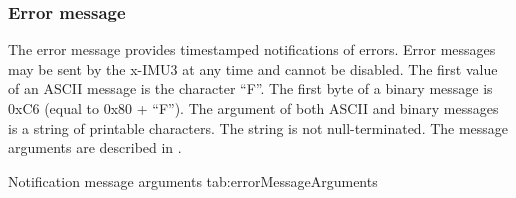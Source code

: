 \subsubsection{Error message}

The error message provides timestamped notifications of errors.  Error messages may be sent by the x-IMU3 at any time and cannot be disabled.  The first value of an \ac{ASCII} message is the character \enquote{F}.  The first byte of a binary message is 0xC6 (equal to 0x80 + \enquote{F}).  The argument of both \ac{ASCII} and binary messages is a string of printable characters.  The string is not null-terminated.  The message arguments are described in .

\begingroup
    \def\tempArgumentA{Error string}
    \dataMessageTable
    {Notification message arguments}
    {tab:errorMessageArguments}
\endgroup

\begingroup
    \def\tempNameA{String}
    \def\tempValueA{Battery empty.}
    \def\tempAsciiFirst{F}
    \def\tempAsciiA{Battery empty.}
    \def\tempBinaryFirst{C6}
    \def\tempBinaryA{42 61 74 74 65 72 79 20 65 6D 70 74 79 2E}
    \dataMessageExample
\endgroup
